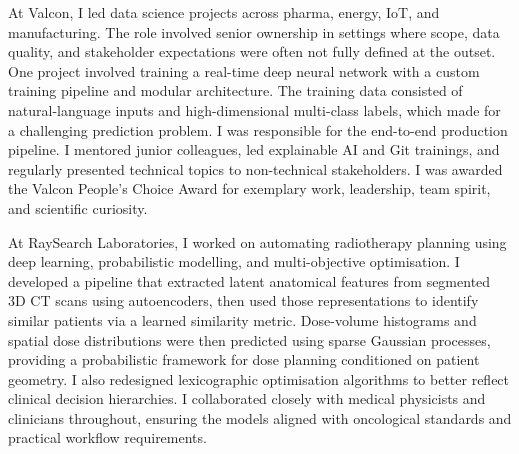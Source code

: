 \documentclass[11pt,a4paper]{moderncv}
\begin{document}
\label{sec:valcon}
 {
    At Valcon, I led data science projects across pharma, energy, IoT, and manufacturing. The role involved senior ownership in settings where scope, data quality, and stakeholder expectations were often not fully defined at the outset.
    \newline\hspace*{2em}
    One project involved training a real-time deep neural network with a custom training pipeline and modular architecture. The training data consisted of natural-language inputs and high-dimensional multi-class labels, which made for a challenging prediction problem. I was responsible for the end-to-end production pipeline.
    \newline\hspace*{2em}
    I mentored junior colleagues, led explainable AI and Git trainings, and regularly presented technical topics to non-technical stakeholders. I was awarded the Valcon People's Choice Award for exemplary work, leadership, team spirit, and scientific curiosity.
}{}

\label{sec:valtech}

\label{sec:raysearch}
 {
    At RaySearch Laboratories, I worked on automating radiotherapy planning using deep learning, probabilistic modelling, and multi-objective optimisation. I developed a pipeline that extracted latent anatomical features from segmented 3D CT scans using autoencoders, then used those representations to identify similar patients via a learned similarity metric. Dose-volume histograms and spatial dose distributions were then predicted using sparse Gaussian processes, providing a probabilistic framework for dose planning conditioned on patient geometry. I also redesigned lexicographic optimisation algorithms to better reflect clinical decision hierarchies.
    \newline\hspace*{2em}
    I collaborated closely with medical physicists and clinicians throughout, ensuring the models aligned with oncological standards and practical workflow requirements.
}{}
\end{document}
